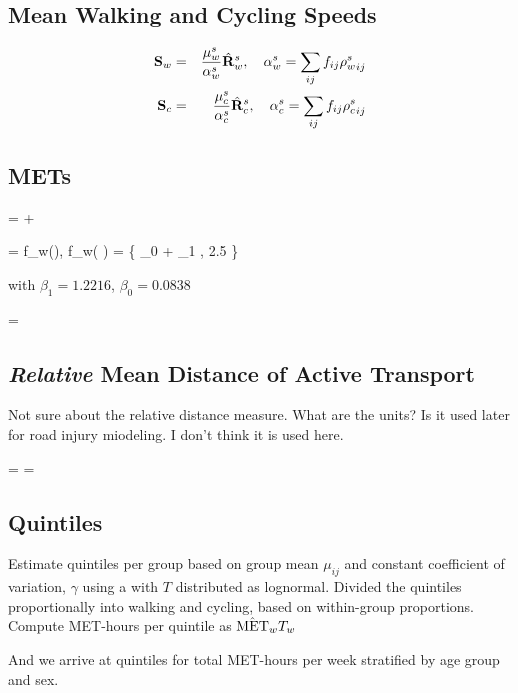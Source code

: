 \subsection{Mean Walking and Cycling Speeds}

\begin{eqnarray}
\mathbf{S}_w &=& \frac{\mu^s_w}{\alpha^s_w}\hat{\mathbf{R}}^s_w, \quad \alpha^s_w = \sum_{ij} f_{ij}{\rho^s_w}_{ij}\\
\mathbf{S}_c &=& \frac{\mu^s_c}{\alpha^s_c}\hat{\mathbf{R}}^s_c, \quad \alpha^s_c = \sum_{ij} f_{ij}{\rho^s_c}_{ij}
\end{eqnarray}


\subsection{METs}
\beq
\metTransport = \metWalk + \metCycle
\eeq

\beq
\metWalk = f_w\left(\speedWalk\right), \quad f_w\left( \sijw \right) = \max\{ \beta_0 + \beta_1 \sijw, 2.5 \}
\eeq

with $\beta_1 = 1.2216$, $\beta_0 = 0.0838$ 

\beq
\metCycle = 
\eeq

\subsection{\textit{Relative} Mean Distance of Active Transport}

Not sure about the relative distance measure.  What are the units?  Is
it used later for road injury miodeling.  I don't think it is used
here.

\beq
\distWalkMean =  \speedWalk \cdot \walkMean
\eeq
\beq
\distCycleMean =  \speedCycle \cdot \cycleMean
\eeq

\subsection{Quintiles}

Estimate quintiles per group based on group mean $\mu_{ij}$ and
constant coefficient of variation, $\gamma$ using a with $T$
distributed as lognormal.  Divided the quintiles proportionally into
walking and cycling, based on within-group proportions.  Compute MET-hours per quintile as $\hat{\mathbf{\mathrm{MET}}}_{w} T_w$

And we arrive at quintiles for total MET-hours per week stratified by age group and sex.
